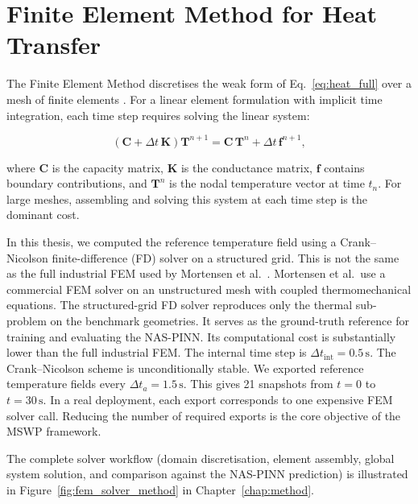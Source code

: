 \section{Finite Element Method for Heat Transfer}
\label{sec:fem_theory}

The Finite Element Method discretises the weak form of
Eq.~\eqref{eq:heat_full} over a mesh of finite elements
\cite{wilson1966,mackerle2003}.
For a linear element formulation with implicit time integration, each time step
requires solving the linear system:

\begin{equation}
\left(\mathbf{C} + \Delta t\,\mathbf{K}\right)\mathbf{T}^{n+1}
= \mathbf{C}\,\mathbf{T}^{n} + \Delta t\,\mathbf{f}^{n+1},
\label{eq:fem_system}
\end{equation}

where $\mathbf{C}$ is the capacity matrix, $\mathbf{K}$ is the conductance
matrix, $\mathbf{f}$ contains boundary contributions, and $\mathbf{T}^n$ is
the nodal temperature vector at time $t_n$.
For large meshes, assembling and solving this system at each time step is
the dominant cost.

In this thesis, we computed the reference temperature field using a
Crank--Nicolson finite-difference (FD) solver on a structured grid.
This is not the same as the full industrial FEM used by Mortensen
et al.~\cite{mortensen2026}.
Mortensen et al.\ use a commercial FEM solver on an unstructured mesh with
coupled thermomechanical equations.
The structured-grid FD solver reproduces only the thermal sub-problem on the
benchmark geometries.
It serves as the ground-truth reference for training and evaluating the
NAS-PINN.
Its computational cost is substantially lower than the full industrial FEM.
The internal time step is $\Delta t_{\mathrm{int}}=0.5\,\mathrm{s}$.
The Crank--Nicolson scheme is unconditionally stable.
We exported reference temperature fields every $\Delta t_a=1.5\,\mathrm{s}$.
This gives 21 snapshots from $t=0$ to $t=30\,\mathrm{s}$.
In a real deployment, each export corresponds to one expensive FEM solver call.
Reducing the number of required exports is the core objective of the MSWP
framework.

The complete solver workflow (domain discretisation, element assembly,
global system solution, and comparison against the NAS-PINN prediction)
is illustrated in Figure~\ref{fig:fem_solver_method} in
Chapter~\ref{chap:method}.

